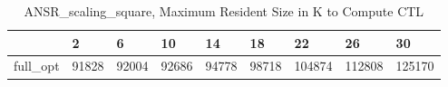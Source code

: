 \begin{table}
\caption{ANSR\_scaling\_square, Maximum Resident Size in K to Compute CTL}
\label{ANSR_scaling_square_CTL_size}
\begin{tabular}{lllllllll}
\toprule
 & 2 & 6 & 10 & 14 & 18 & 22 & 26 & 30 \\
\midrule
full\_opt & 91828 & 92004 & 92686 & 94778 & 98718 & 104874 & 112808 & 125170 \\
\bottomrule
\end{tabular}
\end{table}

